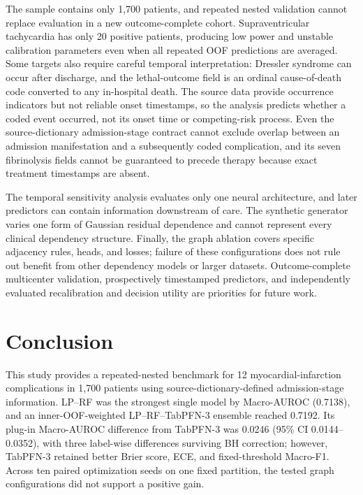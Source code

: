 \documentclass{ieeeaccess}
\begin{document}
The sample contains only 1,700 patients, and repeated nested validation cannot replace evaluation in a new outcome-complete cohort. Supraventricular tachycardia has only 20 positive patients, producing low power and unstable calibration parameters even when all repeated OOF predictions are averaged. Some targets also require careful temporal interpretation: Dressler syndrome can occur after discharge, and the lethal-outcome field is an ordinal cause-of-death code converted to any in-hospital death. The source data provide occurrence indicators but not reliable onset timestamps, so the analysis predicts whether a coded event occurred, not its onset time or competing-risk process. Even the source-dictionary admission-stage contract cannot exclude overlap between an admission manifestation and a subsequently coded complication, and its seven fibrinolysis fields cannot be guaranteed to precede therapy because exact treatment timestamps are absent.

The temporal sensitivity analysis evaluates only one neural architecture, and later predictors can contain information downstream of care. The synthetic generator varies one form of Gaussian residual dependence and cannot represent every clinical dependency structure. Finally, the graph ablation covers specific adjacency rules, heads, and losses; failure of these configurations does not rule out benefit from other dependency models or larger datasets. Outcome-complete multicenter validation, prospectively timestamped predictors, and independently evaluated recalibration and decision utility are priorities for future work.

\section{Conclusion}
\label{sec:conclusion}

This study provides a repeated-nested benchmark for 12 myocardial-infarction complications in 1,700 patients using source-dictionary-defined admission-stage information. LP--RF was the strongest single model by Macro-AUROC (0.7138), and an inner-OOF-weighted LP--RF--TabPFN-3 ensemble reached 0.7192. Its plug-in Macro-AUROC difference from TabPFN-3 was 0.0246 (95\% CI 0.0144--0.0352), with three label-wise differences surviving BH correction; however, TabPFN-3 retained better Brier score, ECE, and fixed-threshold Macro-F1. Across ten paired optimization seeds on one fixed partition, the tested graph configurations did not support a positive gain.
\end{document}
